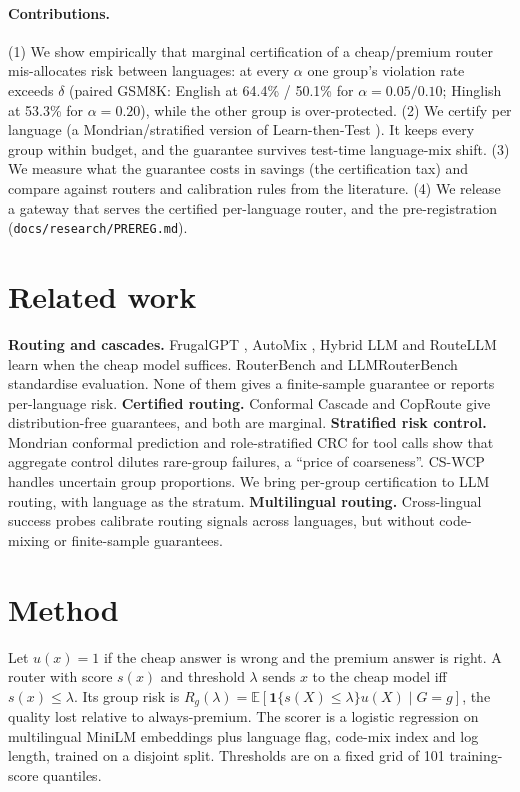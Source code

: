 \documentclass[11pt]{article}
\begin{document}
\paragraph{Contributions.}
(1) We show empirically that marginal certification of a cheap/premium router
mis-allocates risk between languages: at every $\alpha$ one group's violation rate exceeds
$\delta$ (paired GSM8K: English at 64.4\% / 50.1\% for $\alpha=0.05/0.10$; Hinglish at
53.3\% for $\alpha=0.20$), while the other group is over-protected.
(2) We certify per language (a Mondrian/stratified version of Learn-then-Test
\citep{vovk2003mondrian,angelopoulos2021ltt}). It keeps every group within budget, and the
guarantee survives test-time language-mix shift. (3) We measure what the guarantee
costs in savings (the certification tax) and compare against routers and calibration
rules from the literature. (4) We release a gateway that serves the certified per-language
router, and the pre-registration (\texttt{docs/research/PREREG.md}).

\section{Related work}
\textbf{Routing and cascades.} FrugalGPT \citep{chen2023frugalgpt}, AutoMix
\citep{aggarwal2023automix}, Hybrid LLM \citep{ding2024hybrid} and RouteLLM
\citep{ong2024routellm} learn when the cheap model suffices. RouterBench
\citep{hu2024routerbench} and LLMRouterBench \citep{llmrouterbench2026} standardise evaluation.
None of them gives a finite-sample guarantee or reports per-language risk.
\textbf{Certified routing.} Conformal Cascade \citep{dou2026conformalcascade} and CopRoute
\citep{copRoute2026} give distribution-free guarantees, and both are marginal.
\textbf{Stratified risk control.} Mondrian conformal prediction \citep{vovk2003mondrian}
and role-stratified CRC for tool calls \citep{rahman2026rolestratified} show that aggregate
control dilutes rare-group failures, a ``price of coarseness''. CS-WCP
\citep{cswcp2026} handles uncertain group proportions. We bring per-group certification to
LLM routing, with language as the stratum.
\textbf{Multilingual routing.} Cross-lingual success probes \citep{probes2026crosslingual}
calibrate routing signals across languages, but without code-mixing or finite-sample
guarantees.

\section{Method}
Let $u(x)=1$ if the cheap answer is wrong and the premium answer is right. A router with
score $s(x)$ and threshold $\lambda$ sends $x$ to the cheap model iff $s(x)\le\lambda$. Its
group risk is $R_g(\lambda)=\mathbb{E}[\mathbf{1}\{s(X)\le\lambda\}u(X)\mid G=g]$, the
quality lost relative to always-premium. The scorer is a logistic regression on multilingual
MiniLM embeddings plus language flag, code-mix index and log length, trained on a
disjoint split. Thresholds are on a fixed grid of 101 training-score quantiles.
\end{document}
